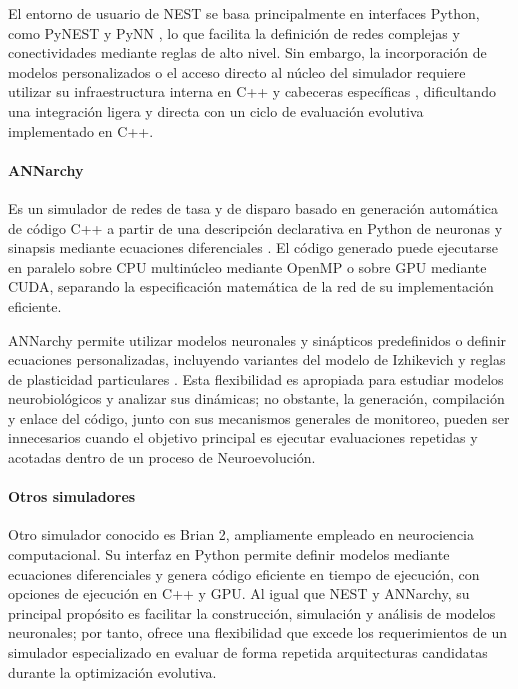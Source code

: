 El entorno de usuario de NEST se basa principalmente en interfaces Python, como PyNEST y PyNN \cite{Eppler2008PyNEST}, lo que facilita la definición de redes complejas y conectividades mediante reglas de alto nivel. Sin embargo, la incorporación de modelos personalizados o el acceso directo al núcleo del simulador requiere utilizar su infraestructura interna en C++ y cabeceras específicas \cite{NESTGitHub}, dificultando una integración ligera y directa con un ciclo de evaluación evolutiva implementado en C++.

\paragraph{ANNarchy}
Es un simulador de redes de tasa y de disparo basado en generación automática de código C++ a partir de una descripción declarativa en Python de neuronas y sinapsis mediante ecuaciones diferenciales \cite{Vitay2015ANNarchySimulator}. El código generado puede ejecutarse en paralelo sobre CPU multinúcleo mediante OpenMP o sobre GPU mediante CUDA, separando la especificación matemática de la red de su implementación eficiente.

ANNarchy permite utilizar modelos neuronales y sinápticos predefinidos o definir ecuaciones personalizadas, incluyendo variantes del modelo de Izhikevich y reglas de plasticidad particulares \cite{Vitay2015ANNarchySimulator}. Esta flexibilidad es apropiada para estudiar modelos neurobiológicos y analizar sus dinámicas; no obstante, la generación, compilación y enlace del código, junto con sus mecanismos generales de monitoreo, pueden ser innecesarios cuando el objetivo principal es ejecutar evaluaciones repetidas y acotadas dentro de un proceso de Neuroevolución.

\paragraph{Otros simuladores}

Otro simulador conocido es Brian 2, ampliamente empleado en neurociencia computacional. Su interfaz en Python permite definir modelos mediante ecuaciones diferenciales y genera código eficiente en tiempo de ejecución, con opciones de ejecución en C++ y GPU. Al igual que NEST y ANNarchy, su principal propósito es facilitar la construcción, simulación y análisis de modelos neuronales; por tanto, ofrece una flexibilidad que excede los requerimientos de un simulador especializado en evaluar de forma repetida arquitecturas candidatas durante la optimización evolutiva.

